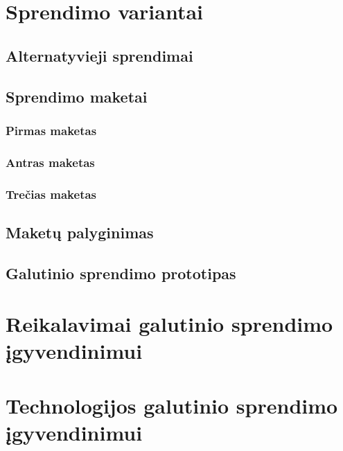 \documentclass{VUMIFPSkursinis}
\begin{document}
\section{Sprendimo variantai}

\subsection{Alternatyvieji sprendimai}

\subsection{Sprendimo maketai}

\subsubsection{Pirmas maketas}
\subsubsection{Antras maketas}
\subsubsection{Trečias maketas}

\subsection{Maketų palyginimas}
\subsection{Galutinio sprendimo prototipas}

\section{Reikalavimai galutinio sprendimo įgyvendinimui}
\section{Technologijos galutinio sprendimo įgyvendinimui}


\end{document}
